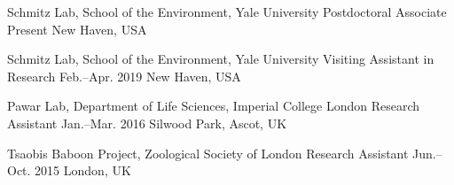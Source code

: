 
\begin{cventries}

  \cventry
    {Schmitz Lab, School of the Environment, Yale University} %
    {Postdoctoral Associate} %
    {Present} %
    {New Haven, USA} %
    {
    }

  \cventry
    {Schmitz Lab, School of the Environment, Yale University} %
    {Visiting Assistant in Research} %
    {Feb.--Apr. 2019} %
    {New Haven, USA} %
    {
    }

  \cventry
    {Pawar Lab, Department of Life Sciences, Imperial College London} %
    {Research Assistant} %
    {Jan.--Mar. 2016} %
    {Silwood Park, Ascot, UK} %
    {
    }

  \cventry
    {Tsaobis Baboon Project, Zoological Society of London} %
    {Research Assistant} %
    {Jun.--Oct. 2015} %
    {London, UK} %
    {
    }


\end{cventries}
